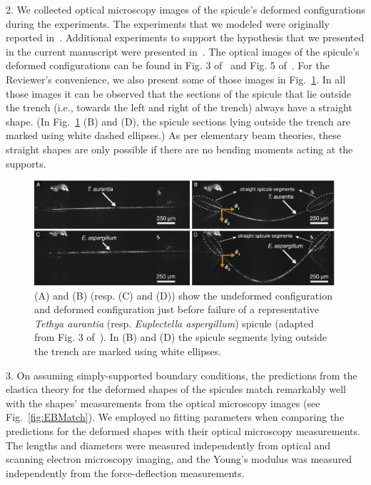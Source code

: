 \documentclass[11pt,letterpaper]{report}
\begin{document}
\begin{enumerate}[label=\textit{1.\arabic*},wide, labelwidth=!, labelindent=0pt]
2. We collected optical microscopy images of the spicule's deformed configurations during the experiments. The experiments that we modeled were originally reported in~\citet{monn2017enhanced}. Additional experiments to support the hypothesis that we presented in the current manuscript were presented in~\citet{kochiyama2021sawtooth}. The optical images of the spicule's deformed configurations can be found in  Fig. 3 of~\citet{monn2017enhanced} and Fig. 5 of~\citet{kochiyama2021sawtooth}. For the Reviewer's convenience, we also present some of those images in Fig.~\ref{fig:photos}. In all those images it can be observed that the
sections of the spicule that lie outside the trench (i.e., towards the left and right  of the trench) always have a straight shape. (In Fig.~\ref{fig:photos} (B) and (D), the spicule sections lying outside the trench are marked using  white dashed ellipses.) As per elementary beam theories, these straight shapes are only possible if there are no bending moments acting at the supports.




\begin{figure}[H]
\centering
\includegraphics[width = 1.0\textwidth]{Figures/Straight.pdf}
\caption{(A) and (B) (resp. (C) and (D)) show the undeformed configuration and deformed configuration just before failure of a representative \textit{Tethya aurantia} (resp. \textit{Euplectella aspergillum}) spicule (adapted from Fig. 3 of~\citet{monn2017enhanced}). In (B) and (D) the spicule segments lying outside the trench  are marked using white ellipses.}
\label{fig:photos}
\end{figure}


3. On assuming simply-supported boundary conditions, the predictions from the  elastica  theory for the deformed shapes of the spicules match remarkably well with the shapes' measurements  from the optical microscopy images (see Fig.~\ref{fig:EBMatch}).  We employed no  fitting parameters when comparing the predictions for the deformed shapes with their optical microscopy measurements. The lengths and diameters were measured independently from optical and scanning electron microscopy imaging, and the Young's modulus was measured independently from the force-deflection measurements.


\end{enumerate}
\end{document}
